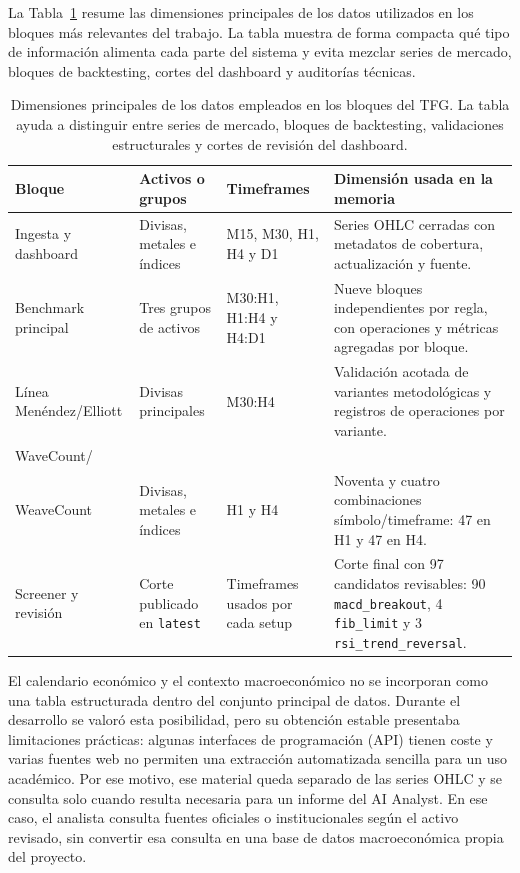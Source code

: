 La Tabla~\ref{tab:dimensiones-datos-estudio} resume las dimensiones principales
de los datos utilizados en los bloques m\'as relevantes del trabajo. La tabla
muestra de forma compacta qu\'e tipo de informaci\'on alimenta cada parte del
sistema y evita mezclar series de mercado, bloques de backtesting, cortes del
dashboard y auditor\'ias t\'ecnicas.

\begin{table}[H]
\centering
\scriptsize
\begin{tabular}{@{}p{} p{} p{} p{}@{}}
\hline
\textbf{Bloque} & \textbf{Activos o grupos} & \textbf{Timeframes} & \textbf{Dimensi\'on usada en la memoria} \\
\hline
Ingesta y dashboard & Divisas, metales e \'indices & M15, M30, H1, H4 y D1 & Series OHLC cerradas con metadatos de cobertura, actualizaci\'on y fuente. \\
Benchmark principal & Tres grupos de activos & M30:H1, H1:H4 y H4:D1 & Nueve bloques independientes por regla, con operaciones y m\'etricas agregadas por bloque. \\
L\'inea Men\'endez/Elliott & Divisas principales & M30:H4 & Validaci\'on acotada de variantes metodol\'ogicas y registros de operaciones por variante. \\
WaveCount/\\WeaveCount & Divisas, metales e \'indices & H1 y H4 & Noventa y cuatro combinaciones s\'imbolo/timeframe: 47 en H1 y 47 en H4. \\
Screener y revisi\'on & Corte publicado en \texttt{latest} & Timeframes usados por cada setup & Corte final con 97 candidatos revisables: 90 \texttt{macd\_breakout}, 4 \texttt{fib\_limit} y 3 \texttt{rsi\_trend\_reversal}. \\
\hline
\end{tabular}
\caption[Dimensiones principales de los datos del estudio]{Dimensiones principales de los datos empleados en los bloques del TFG. La tabla ayuda a distinguir entre series de mercado, bloques de backtesting, validaciones estructurales y cortes de revisi\'on del dashboard.}
\label{tab:dimensiones-datos-estudio}
\end{table}

El calendario econ\'omico y el contexto macroecon\'omico no se
incorporan como una tabla estructurada dentro del conjunto principal de datos.
Durante el desarrollo se valor\'o esta posibilidad, pero su obtenci\'on estable
presentaba limitaciones pr\'acticas: algunas interfaces de programaci\'on (API)
tienen coste y varias fuentes web no permiten una extracci\'on automatizada
sencilla para un uso acad\'emico.
Por ese motivo, ese material queda separado de las series OHLC y se consulta
solo cuando resulta necesaria para un informe del AI Analyst. En ese caso, el
analista consulta fuentes oficiales o institucionales seg\'un el activo
revisado, sin convertir esa consulta en una base de datos macroecon\'omica
propia del proyecto.


